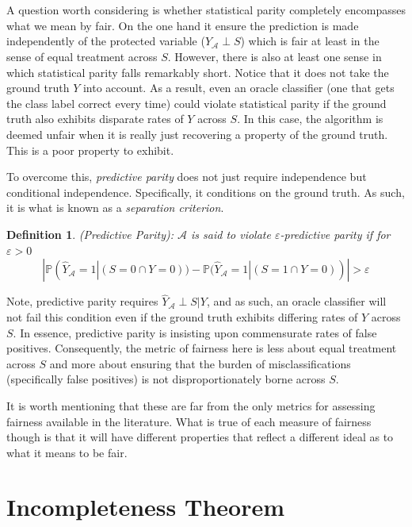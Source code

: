 \documentclass[11pt]{article}
\newtheorem{definition}{Definition}
\begin{document}
A question worth considering is whether statistical parity completely encompasses what we mean by fair.  On the one hand it ensure the prediction is made independently of the protected variable ($\hat{Y}_{\mathcal{A}} \perp S$) which is fair at least in the sense of equal treatment across $S$.  However, there is also at least one sense in which statistical parity falls remarkably short.  Notice that it does not take the ground truth $Y$ into account.  As a result, even an oracle classifier (one that gets the class label correct every time) could violate statistical parity if the ground truth also exhibits disparate rates of $Y$ across $S$.  In this case, the algorithm is deemed unfair when it is really just recovering a property of the ground truth.  This is a poor property to exhibit.  

To overcome this, \textit{predictive parity} does not just require independence but conditional independence.  Specifically, it conditions on the ground truth.  As such, it is what is known as a \textit{separation criterion}.  

\begin{definition}

\textit{(Predictive Parity)}: $\mathcal{A}$ is said to violate $\varepsilon$-predictive parity if for  $\varepsilon>0$
\begin{equation}\label{eq3}
|\mathbb{P}(\hat{Y}_{\mathcal{A}} = 1|(S = 0 \cap Y = 0))-\mathbb{P}(\hat{Y}_{\mathcal{A}} = 1|(S = 1 \cap Y = 0))|>\varepsilon
\end{equation} 
\end{definition}

 Note, predictive parity requires $\hat{Y}_{\mathcal{A}} \perp S|Y$, and as such, an oracle classifier will not fail this condition even if the ground truth exhibits differing rates of $Y$ across $S$. In essence, predictive parity is insisting upon commensurate rates of false positives.  Consequently, the metric of fairness here is less about equal treatment across $S$ and more about ensuring that the burden of misclassifications (specifically false positives) is not disproportionately borne across $S$.  
 
 It is worth mentioning that these are far from the only metrics for assessing fairness available in the literature.  What is true of each measure of fairness though is that it will have different properties that reflect a different ideal as to what it means to be fair.  
 
 \section{Incompleteness Theorem}
 
\end{document}
